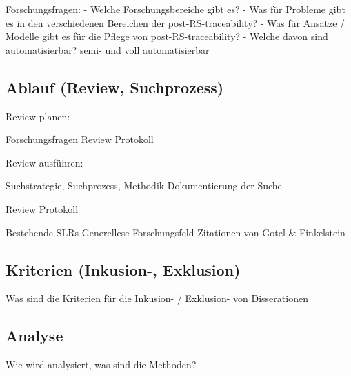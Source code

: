 Forschungsfragen:
- Welche Forschungsbereiche gibt es?
- Was für Probleme gibt es in den verschiedenen Bereichen der post-RS-traceability?
- Was für Ansätze / Modelle gibt es für die Pflege von post-RS-traceability?
- Welche davon sind automatisierbar? semi- und voll automatisierbar

\subsection{Ablauf (Review, Suchprozess)}

Review planen:

Forschungsfragen
Review Protokoll

Review ausführen:

Suchstrategie, Suchprozess, Methodik
Dokumentierung der Suche

Review Protokoll

Bestehende SLRs
Generellese Forschungsfeld
Zitationen von Gotel \& Finkelstein

\subsection{Kriterien (Inkusion-, Exklusion)}

Was sind die Kriterien für die Inkusion- / Exklusion- von Disserationen

\subsection{Analyse}

Wie wird analysiert, was sind die Methoden?


